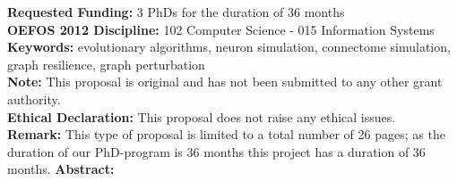 \documentclass[a4paper,11pt]{article}
\begin{document}
%
{\bf Requested Funding:} 3 PhDs for the duration of 36 months
\\[0,3cm]
%
%
{\bf OEFOS 2012 Discipline:} 102 Computer Science - 015  Information Systems 
\\[0,2cm]
{\bf Keywords:} evolutionary algorithms, neuron simulation, connectome simulation, graph resilience, graph perturbation %
\\[0,2cm]
{\bf Note:} This proposal is original and has not been submitted to any other grant authority.
\\[0,2cm]
{\bf Ethical Declaration:} This proposal does not raise any ethical issues.
\\[0,2cm]
{\bf Remark:} This type of proposal is limited to a total number of 26 pages; as the duration of our PhD-program is 36 months this project has a duration of 36 months.
\newpage
%
%
{\bf Abstract:}
\\[0,2cm]
\end{document}
